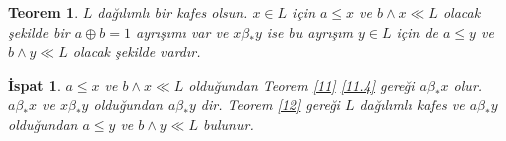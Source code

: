 \documentclass[a4paper,12pt]{article}
\numberwithin{equation}{section}
\theoremstyle{italik}
\newtheorem{teorem}{Teorem}[section]
\newtheorem*{ispat}{İspat}
\begin{document}
\begin{teorem}\label{13}
  $ L $ dağılımlı bir kafes olsun. $ x \in L $ için $ a \leq x $ ve $ b \wedge x \ll L $ olacak şekilde 
  bir $ a \oplus b = 1 $ ayrışımı var ve $ x \beta_* y $ ise bu ayrışım $ y \in L $ için de $ a \leq y $ 
  ve $ b \wedge y \ll L $ olacak şekilde vardır.
\end{teorem}
\begin{ispat}
  $ a \leq x $ ve $ b \wedge x \ll L $ olduğundan Teorem \ref{11} \ref{11.4} gereği $ a \beta_* x $ olur. 
  $ a \beta_* x $ ve $ x \beta_* y $ olduğundan $ a \beta_* y $ dir. Teorem \ref{12} gereği 
  $ L $ dağılımlı kafes ve $ a \beta_* y $ olduğundan $ a \leq y $ ve $ b\wedge y \ll L $ bulunur.
\end{ispat}
\end{document}
